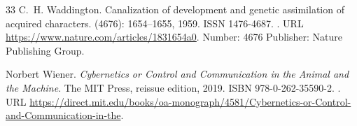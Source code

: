 \documentclass[12pt,fleqn]{article}
\begin{document}
\begin{thebibliography}{33}
  C.~H. Waddington.
  \newblock Canalization of development and genetic assimilation of acquired
  characters.
   (4676): 1654--1655, 1959.
  \newblock ISSN 1476-4687.
  \newblock {}.
  \newblock URL \url{https://www.nature.com/articles/1831654a0}.
  \newblock Number: 4676 Publisher: Nature Publishing Group.

  Norbert Wiener.
  \newblock \emph{Cybernetics or Control and Communication in the Animal and the
    Machine}.
  \newblock The {MIT} Press, reissue edition, 2019.
  \newblock ISBN 978-0-262-35590-2.
  \newblock {}.
  \newblock URL
  \url{https://direct.mit.edu/books/oa-monograph/4581/Cybernetics-or-Control-and-Communication-in-the}.

\end{thebibliography}
\end{document}
